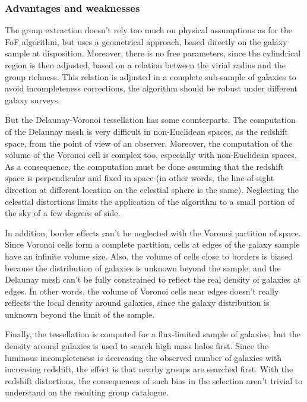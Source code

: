\subsubsection{Advantages and weaknesses}
\label{ssub:advantages}

The group extraction doesn't rely too much on physical assumptions as for the
FoF algorithm, but uses a geometrical approach, based directly on the galaxy
sample at disposition. Moreover, there is no free parameters, since the
cylindrical region is then adjusted, based on a relation between the virial
radius and the group richness. This relation is adjusted in a complete
sub-sample of galaxies to avoid incompleteness corrections, the algorithm
should be robust under different galaxy surveys.

But the Delaunay-Voronoi tessellation has some counterparts. The computation of
the Delaunay mesh is very difficult in non-Euclidean spaces, as the redshift
space, from the point of view of an observer. Moreover, the computation of the
volume of the Voronoi cell is complex too, especially with non-Euclidean
spaces. As a consequence, the computation must be done assuming that the
redshift space is perpendicular and fixed in space (in other words, the
line-of-sight direction at different location on the celestial sphere is the
same). Neglecting the celestial distortions limits the application of the
algorithm to a small portion of the sky of a few degrees of side.

In addition, border effects can't be neglected with the Voronoi partition of
space. Since Voronoi cells form a complete partition, cells at edges of the
galaxy sample have an infinite volume size. Also, the volume of cells close to
borders is biased because the distribution of galaxies is unknown beyond the
sample, and the Delaunay mesh can't be fully constrained to reflect the real
density of galaxies at edges. In other words, the volume of Voronoi cells near
edges doesn't really reflects the local density around galaxies, since the
galaxy distribution is unknown beyond the limit of the sample.

Finally, the tessellation is computed for a flux-limited sample of galaxies,
but the density around galaxies is used to search high mass halos first. Since
the luminous incompleteness is decreasing the observed number of galaxies with
increasing redshift, the effect is that nearby groups are searched first. With
the redshift distortions, the consequences of such bias in the selection aren't
trivial to understand on the resulting group catalogue.

